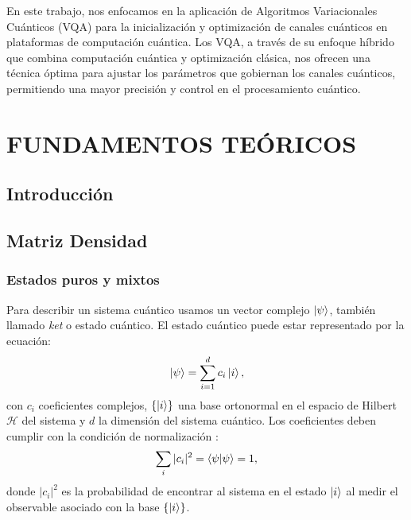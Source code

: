 \documentclass[letterpaper,12pt]{thesisECFM}
\theoremstyle{plain}
\theoremstyle{definition}
\theoremstyle{definition}
\theoremstyle{remark}
\newcommand{\1}{\mathbb{1}}
\begin{document}
En este trabajo, nos enfocamos en la aplicación de Algoritmos Variacionales Cuánticos (VQA) para la inicialización y optimización de canales cuánticos en plataformas de computación cuántica. Los VQA, a través de su enfoque híbrido que combina computación cuántica y optimización clásica, nos ofrecen una técnica óptima para ajustar los parámetros que gobiernan los canales cuánticos, permitiendo una mayor precisión y control en el procesamiento cuántico.

\chapter{FUNDAMENTOS TEÓRICOS} \label{cap:fundamentos:teoricos}%
\section{Introducción} %
\section{Matriz Densidad} %
\subsection{Estados puros y mixtos} %
Para describir un sistema cuántico usamos un vector complejo $\ket{\psi}$,
también llamado \textit{ket} o estado cuántico. El
estado cuántico puede estar representado por la ecuación: 
\begin{equation}
     \label{eq:1.1}
         \ket{\psi} = \sum_{i=1}^{d} c_i \ket{i},
\end{equation}
con $c_i$ coeficientes complejos,
$\{\ket{i}\}$ una base ortonormal en el espacio de Hilbert $\mathcal{H}$ del
sistema  y $d$ la dimensión del
sistema cuántico.  Los coeficientes deben cumplir con la condición de
normalización \cite{nielsen_chuang_2011}:
    \begin{equation}
    \label{ec::1.2}
           \sum_i |c_i|^2=\braket{\psi}{\psi}=1, 
    \end{equation} 
donde $|c_i|^2$ es la probabilidad de encontrar al sistema en el estado
$\ket{i}$ al medir el observable asociado con la base $\{\ket{i} \}$.
\end{document}
